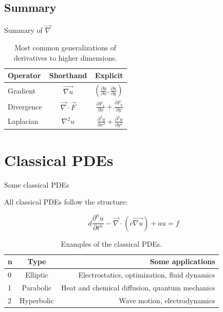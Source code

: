 \documentclass{beamer}
\begin{document}
\subsection{Summary}

  \begin{frame}{Summary of $\vec \nabla$}

    \begin{table}
    \centering
    \begin{tabular}{l|c|r}
    Operator & Shorthand & Explicit \\\hline
    Gradient & $\vec{\nabla u}$ & $\left( \frac{\partial u}{\partial x}, \frac{\partial u}{\partial y} \right) $\\
    Divergence & $\vec \nabla \cdot \vec F$ & $\frac{\partial F_x}{\partial x} + \frac{\partial F_y}{\partial y}$\\
    Laplacian & $\nabla^2 u$ & $\frac{\partial^2 u}{\partial x^2} + \frac{\partial^2 u}{\partial y^2}$
    \end{tabular}
    \caption{\label{tab:widgets}Most common generalizations of derivatives to higher dimensions.}
    \end{table}

  \end{frame}

\section{Classical PDEs}

  \begin{frame}{Some classical PDEs}

    All classical PDEs follow the structure:

    \begin{displaymath}
    d \frac{\partial^n u}{\partial t^n} - \vec \nabla \cdot (c \vec{\nabla u}) + a u= f
    \end{displaymath}

    \pause

    \begin{table}
    \centering
    \begin{tabular}{l|c|r}
    n & Type & Some applications \\\hline
    0 & Elliptic & Electrostatics, optimization, fluid dynamics\\
    1 & Parabolic & Heat and chemical diffusion, quantum mechanics\\
    2 & Hyperbolic & Wave motion, electrodynamics
    \end{tabular}
    \caption{\label{tab:classicalPDEs}Examples of the classical PDEs.}
    \end{table}
    
  \end{frame}
\end{document}
